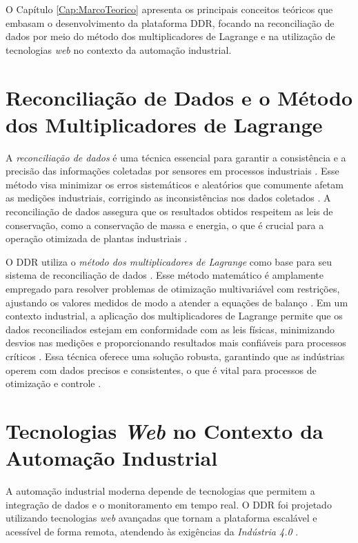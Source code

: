\label{Cap:MarcoTeorico}

O Capítulo \ref{Cap:MarcoTeorico} apresenta os principais conceitos teóricos que embasam o desenvolvimento da plataforma DDR, focando na reconciliação de dados por meio do método dos multiplicadores de Lagrange e na utilização de tecnologias \textit{web} no contexto da automação industrial.

\section{Reconciliação de Dados e o Método dos Multiplicadores de Lagrange}

A \textit{reconciliação de dados} é uma técnica essencial para garantir a consistência e a precisão das informações coletadas por sensores em processos industriais \cite{datarecshakar}. Esse método visa minimizar os erros sistemáticos e aleatórios que comumente afetam as medições industriais, corrigindo as inconsistências nos dados coletados \cite{datarecragnoli}. A reconciliação de dados assegura que os resultados obtidos respeitem as leis de conservação, como a conservação de massa e energia, o que é crucial para a operação otimizada de plantas industriais \cite{balancecontrol}.

O DDR utiliza o \textit{método dos multiplicadores de Lagrange} como base para seu sistema de reconciliação de dados \cite{optimizationlagrange1982}. Esse método matemático é amplamente empregado para resolver problemas de otimização multivariável com restrições, ajustando os valores medidos de modo a atender a equações de balanço \cite{computecontrol}. Em um contexto industrial, a aplicação dos multiplicadores de Lagrange permite que os dados reconciliados estejam em conformidade com as leis físicas, minimizando desvios nas medições e proporcionando resultados mais confiáveis para processos críticos \cite{danielhoduin}. Essa técnica oferece uma solução robusta, garantindo que as indústrias operem com dados precisos e consistentes, o que é vital para processos de otimização e controle \cite{reformulationdatarecon}.

\section{Tecnologias \textit{Web} no Contexto da Automação Industrial}

A automação industrial moderna depende de tecnologias que permitem a integração de dados e o monitoramento em tempo real. O DDR foi projetado utilizando tecnologias \textit{web} avançadas que tornam a plataforma escalável e acessível de forma remota, atendendo às exigências da \textit{Indústria 4.0} \cite{webusage}. 

